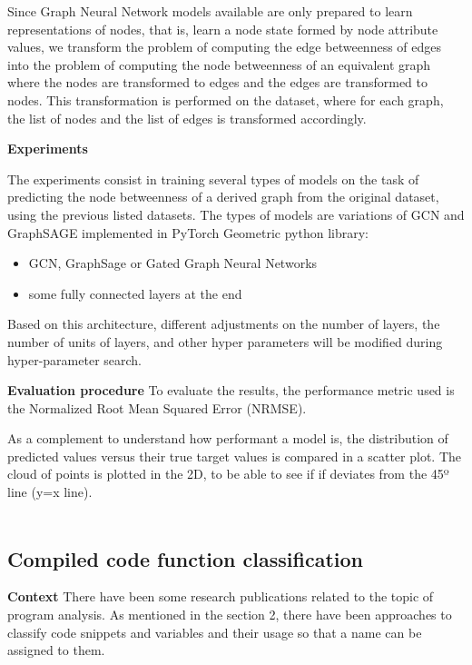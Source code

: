Since Graph Neural Network models available are only prepared to learn representations of nodes, that is, learn a node state formed by node attribute values, we transform the problem of computing the edge betweenness of edges into the problem of computing the node betweenness of an equivalent graph where the nodes are transformed to edges and the edges are transformed to nodes. This transformation is performed on the dataset, where for each graph, the list of nodes and the list of edges is transformed accordingly. 

\textbf{Experiments}

The experiments consist in training several types of models on the task of predicting the node betweenness of a derived graph from the original dataset, using the previous listed  datasets. The types of models are variations of GCN and GraphSAGE implemented in PyTorch Geometric python library:
\begin{itemize}
	\item GCN, GraphSage or Gated Graph Neural Networks
	\item some fully connected layers at the end
\end{itemize}
Based on this architecture, different adjustments on the number of layers, the number of units of layers, and other hyper parameters will be modified during hyper-parameter search.

\textbf{Evaluation procedure}
To evaluate the results, the performance metric used is the Normalized Root Mean Squared Error (NRMSE). 

As a complement to understand how performant a model is, the distribution of predicted values versus their true target values is compared in a scatter plot. The cloud of points is plotted in the 2D, to be able to see if if deviates from the 45º line (y=x line). \\
\\




\subsection{Compiled code function classification}

\textbf{Context}
There have been some research publications related to the topic of program analysis. As mentioned in the section 2, there have been approaches to classify code snippets \cite{code2vec} and variables \cite{139} and their usage so that a name can be assigned to them. 

